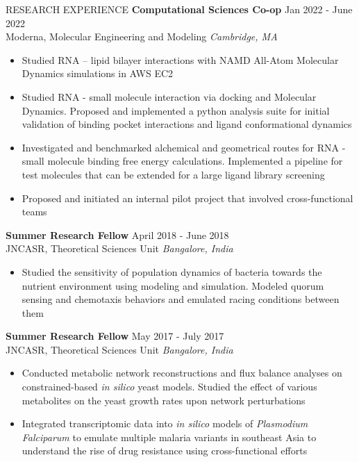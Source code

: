 \documentclass{resume} %
\begin{document}
\begin{rSection}{RESEARCH EXPERIENCE}
\textbf{Computational Sciences Co-op} \hfill Jan 2022 - June 2022\\
Moderna, Molecular Engineering and Modeling \hfill \textit{Cambridge, MA}
 \begin{itemize}
    \itemsep -3pt {} 
     \item Studied RNA – lipid bilayer interactions with NAMD All-Atom Molecular Dynamics simulations in AWS EC2
     \item Studied RNA - small molecule interaction via docking and Molecular Dynamics. Proposed and implemented a python analysis suite for initial validation of binding pocket interactions and ligand conformational dynamics
     \item Investigated and benchmarked alchemical and geometrical routes for RNA - small molecule binding free energy calculations. Implemented a pipeline for test molecules that can be extended for a large ligand library screening
    \item  Proposed and initiated an internal pilot project that involved cross-functional teams
 \end{itemize}

 \textbf{Summer Research Fellow} \hfill April 2018 - June 2018\\
JNCASR, Theoretical Sciences Unit \hfill \textit{Bangalore, India}
 \begin{itemize}
    \itemsep -3pt {} 
     \item Studied the sensitivity of population dynamics of bacteria towards the nutrient environment using modeling and simulation. Modeled quorum sensing and chemotaxis behaviors and emulated racing conditions between them
 \end{itemize}

 \textbf{Summer Research Fellow} \hfill May 2017 - July 2017\\
JNCASR, Theoretical Sciences Unit \hfill \textit{Bangalore, India}
 \begin{itemize}
    \itemsep -3pt {} 
     \item Conducted metabolic network reconstructions and flux balance analyses on constrained-based \textit{in silico} yeast models. Studied the effect of various metabolites on the yeast growth rates upon network perturbations
     \item Integrated transcriptomic data into \textit{in silico} models of \textit{Plasmodium Falciparum} to emulate multiple malaria variants in southeast Asia to understand the rise of drug resistance using cross-functional efforts
 \end{itemize}

\end{rSection} 
\end{document}
